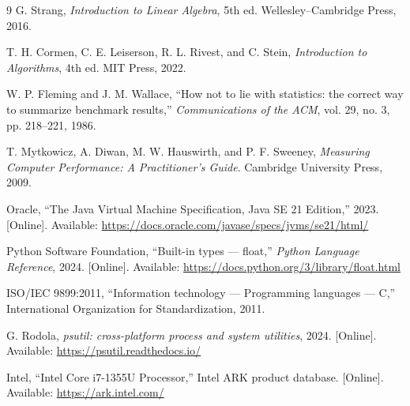 \documentclass[11pt,a4paper]{article}
\begin{document}
\begin{thebibliography}{9}
G. Strang, \emph{Introduction to Linear Algebra}, 5th ed.
Wellesley--Cambridge Press, 2016.

T. H. Cormen, C. E. Leiserson, R. L. Rivest, and C. Stein,
\emph{Introduction to Algorithms}, 4th ed. MIT Press, 2022.

W. P. Fleming and J. M. Wallace, ``How not to lie with statistics: the correct
way to summarize benchmark results,'' \emph{Communications of the ACM},
vol. 29, no. 3, pp. 218--221, 1986.

T. Mytkowicz, A. Diwan, M. W. Hauswirth, and P. F. Sweeney,
\emph{Measuring Computer Performance: A Practitioner's Guide}.
Cambridge University Press, 2009.

Oracle, ``The Java Virtual Machine Specification, Java SE 21 Edition,'' 2023.
[Online]. Available:
\url{https://docs.oracle.com/javase/specs/jvms/se21/html/}

Python Software Foundation, ``Built-in types --- float,'' \emph{Python Language
Reference}, 2024. [Online]. Available: \url{https://docs.python.org/3/library/float.html}

ISO/IEC 9899:2011, ``Information technology --- Programming languages --- C,''
International Organization for Standardization, 2011.

G. Rodola, \emph{psutil: cross-platform process and system utilities},
2024. [Online]. Available: \url{https://psutil.readthedocs.io/}

Intel, ``Intel Core i7-1355U Processor,'' Intel ARK product database.
[Online]. Available: \url{https://ark.intel.com/}
\end{thebibliography}
\end{document}
